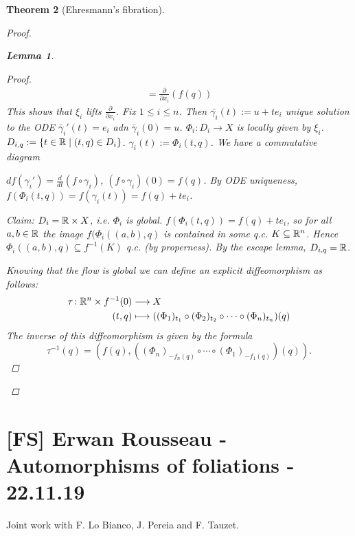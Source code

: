 \documentclass[A4paper, british, reqno]{amsart}
\theoremstyle{darkgreentheorem}
\newtheorem{thm}{Theorem}[section]
\newtheorem{lm}[thm]{Lemma}
\theoremstyle{darkbluedefinition}
\theoremstyle{darkredexample}
\theoremstyle{remark}
\newcommand{\1}{\mathbbm{1}}
\newcommand{\tms}{\times}
\newcommand{\sub}{\subseteq}
\begin{document}
\begin{thm}[Ehresmann's fibration]
\begin{proof}
\begin{lm}
\begin{proof}
\begin{multline*}
		    =\frac{\partial}{\partial x_{i}}(f(q))
		\end{multline*}
		This shows that $\xi_{i}$ lifts $\frac{\partial}{\partial x_{i}}$.
		Fix $1\leqslant i\leqslant n$.
		Then $\bar{\gamma_{i}}(t):=u+te_{i}$ unique solution to the ODE $\bar{\gamma}_{i}'(t)=e_{i}$ adn $\bar{\gamma}_{i}(0)=u$.
		$\Phi_{i}\colon D_{i}\to X$ is locally given by $\xi_{i}$.
		$D_{i,q}:=\{t\in \mathbb{R}\mid (t,q)\in D_{i}\}$.
		$\gamma_{i}(t):=\Phi_{i}(t,q)$.
		We have a commutative diagram
		\begin{center}
		\end{center}
		$df(\gamma_{i}')=\frac{d}{dt}(f\circ \gamma_{i})$, $(f\circ \gamma_{i})(0)=f(q)$.
		By ODE uniqueness, $f(\Phi_{i}(t,q))=f(\gamma_{i}(t))=f(q)+te_{i}$.

		Claim: $D_{i}=\R\tms X$, i.e. $\Phi_{i}$ is global.
		$f(\Phi_{i}(t,q))=f(q)+te_{i}$, so for all $a,b\in \mathbb{R}$ the image $f(\Phi_{i}((a,b),q)$ is contained in some q.c. $K\sub \R^{n}$.
		Hence $\Phi_{i}((a,b),q)\sub f^{-1}(K)$ q.c. (by properness).
		By the escape lemma, $D_{i,q}=\mathbb{R}$.
		
		Knowing that the flow is global we can define an explicit diffeomorphism as follows:
		\begin{align*}
		    \tau\colon \R^{n}\tms f^{-1}(0) & \longrightarrow X \\
		    (t,q) &\longmapsto ((\Phi_{1})_{t_{1}}\circ (\Phi_{2})_{t_{2}}\circ \cdots \circ (\Phi_{n})_{t_{n}})(q)
		\end{align*}
		The inverse of this diffeomorphism is given by the formula
		\[ \tau^{-1}(q)=(f(q),((\Phi_{n})_{-f_{n}(q)}\circ \cdots \circ (\Phi_{1})_{-f_{1}(q)})(q)). \]
	    \end{proof}
	\end{lm}
    \end{proof}
\end{thm}

\section{[FS] Erwan Rousseau - Automorphisms of foliations - 22.11.19}

Joint work with F. Lo Bianco, J. Pereia and F. Tauzet.
\end{document}
